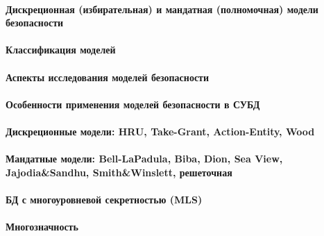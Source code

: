 \paragraph{Дискреционная (избирательная) и мандатная (полномочная) модели безопасности}
\paragraph{Классификация моделей}
\paragraph{Аспекты исследования моделей безопасности}
\paragraph{Особенности применения моделей безопасности в СУБД}
\paragraph{Дискреционные модели: HRU, Take-Grant, Action-Entity, Wood}
\paragraph{Мандатные модели: Bell-LaPadula, Biba, Dion, Sea View, Jajodia\&Sandhu, Smith\&Winslett, решеточная}
\paragraph{БД с многоуровневой секретностью (MLS)}
\paragraph{Многозначность}